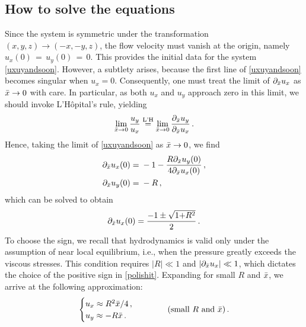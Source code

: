 \documentclass[a4paper, amsfonts, amssymb, amsmath, reprint, showkeys, nofootinbib, twoside,notitlepage,onecolumn]{revtex4-1}
\newcommand{\spc}{\quad \quad \quad}
\theoremstyle{definition}
\theoremstyle{theorem}
\begin{document}
\vspace{-0.2cm}
\subsection{How to solve the equations}
\vspace{-0.3cm}

Since the system is symmetric under the transformation $(x,y,z)\rightarrow ({-}x,{-}y,z)$, the flow velocity must vanish at the origin, namely $u_x(0)\,{=}\,u_y(0)\,{=}\,0$. This provides the initial data for the system \eqref{uxuyandsoon}. However, a subtlety arises, because the first line of \eqref{uxuyandsoon} becomes singular when $u_x=0$. Consequently, one must treat the limit of $\partial_{\Bar{x}}u_x$ as $\Bar{x}\rightarrow 0$ with care. In particular, as both $u_x$ and $u_y$ approach zero in this limit, we should invoke L'H\^{o}pital's rule, yielding
\vspace{-0.1cm}
\begin{equation}
\lim_{\Bar{x}\rightarrow 0} \dfrac{u_y}{u_x} \stackrel{\text{L'H}}{=} \lim_{\Bar{x}\rightarrow 0} \dfrac{\partial_{\Bar{x}} u_y}{\partial_{\Bar{x}} u_x} \, .
\end{equation}
Hence, taking the limit of \eqref{uxuyandsoon} as $\Bar{x}\rightarrow 0$, we find
\begin{equation}
\begin{split}
\partial_{\Bar{x}} u_x(0) ={}& -1-\dfrac{R \partial_{\Bar{x}} u_y(0)}{4 \partial_{\Bar{x}} u_x(0)} \, , \\
\partial_{\Bar{x}} u_y(0) ={}& -R  \, , \\
\end{split}    
\end{equation}
which can be solved to obtain
\vspace{-0.1cm}
\begin{equation}\label{polishit}
\partial_{\Bar{x}} u_x(0) = \dfrac{-1\pm \sqrt{1{+}R^2}}{2} \, .  
\end{equation}
To choose the sign, we recall that hydrodynamics is valid only under the assumption of near local equilibrium, i.e., when the pressure greatly exceeds the viscous stresses. This condition requires $|R|\ll 1$ and $|\partial_{\Bar{x}} u_x|\ll 1$, which dictates the choice of the positive sign in \eqref{polishit}. Expanding for small $R$ and $\Bar{x}$, we arrive at the following approximation:
\vspace{-0.1cm}
\begin{equation}\label{uxuysolutionapprox}
\begin{cases}
u_x \approx  R^2\Bar{x}/4 \, , \\
u_y \approx   -R\Bar{x} \, . \\
\end{cases} \spc (\text{small }R\text{ and }\Bar{x}) \, .
\end{equation}
\end{document}
